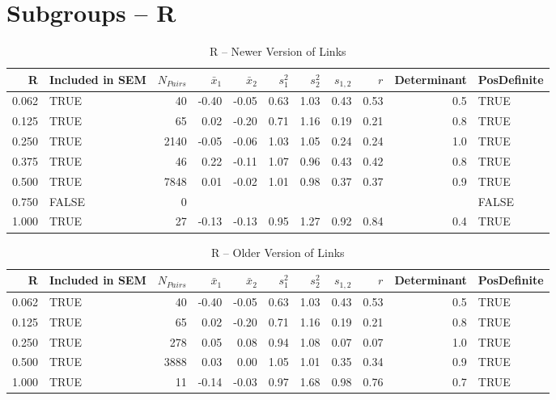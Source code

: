 \documentclass{article}\usepackage[]{graphicx}\usepackage[]{color}
\begin{document}
\section{Subgroups --  R }%
\begin{table}[ht]
\centering
\begin{tabular}{rlrrrrrrrrl}
  \hline
R & Included in SEM & $N_{Pairs}$ & $\bar{x}_1$ & $\bar{x}_2$ & $s_1^2$ & $s_2^2$ & $s_{1,2}$ & $r$ & Determinant & PosDefinite \\ 
  \hline
0.062 & TRUE & 40 & -0.40 & -0.05 & 0.63 & 1.03 & 0.43 & 0.53 & 0.5 & TRUE \\ 
  0.125 & TRUE & 65 & 0.02 & -0.20 & 0.71 & 1.16 & 0.19 & 0.21 & 0.8 & TRUE \\ 
  0.250 & TRUE & 2140 & -0.05 & -0.06 & 1.03 & 1.05 & 0.24 & 0.24 & 1.0 & TRUE \\ 
  0.375 & TRUE & 46 & 0.22 & -0.11 & 1.07 & 0.96 & 0.43 & 0.42 & 0.8 & TRUE \\ 
  0.500 & TRUE & 7848 & 0.01 & -0.02 & 1.01 & 0.98 & 0.37 & 0.37 & 0.9 & TRUE \\ 
  0.750 & FALSE & 0 &  &  &  &  &  &  &  & FALSE \\ 
  1.000 & TRUE & 27 & -0.13 & -0.13 & 0.95 & 1.27 & 0.92 & 0.84 & 0.4 & TRUE \\ 
   \hline
\end{tabular}
\caption{R -- Newer Version of Links} 
\end{table}
\begin{table}[ht]
\centering
\begin{tabular}{rlrrrrrrrrl}
  \hline
R & Included in SEM & $N_{Pairs}$ & $\bar{x}_1$ & $\bar{x}_2$ & $s_1^2$ & $s_2^2$ & $s_{1,2}$ & $r$ & Determinant & PosDefinite \\ 
  \hline
0.062 & TRUE & 40 & -0.40 & -0.05 & 0.63 & 1.03 & 0.43 & 0.53 & 0.5 & TRUE \\ 
  0.125 & TRUE & 65 & 0.02 & -0.20 & 0.71 & 1.16 & 0.19 & 0.21 & 0.8 & TRUE \\ 
  0.250 & TRUE & 278 & 0.05 & 0.08 & 0.94 & 1.08 & 0.07 & 0.07 & 1.0 & TRUE \\ 
  0.500 & TRUE & 3888 & 0.03 & 0.00 & 1.05 & 1.01 & 0.35 & 0.34 & 0.9 & TRUE \\ 
  1.000 & TRUE & 11 & -0.14 & -0.03 & 0.97 & 1.68 & 0.98 & 0.76 & 0.7 & TRUE \\ 
   \hline
\end{tabular}
\caption{R -- Older Version of Links} 
\end{table}
\newpage 
\end{document}
